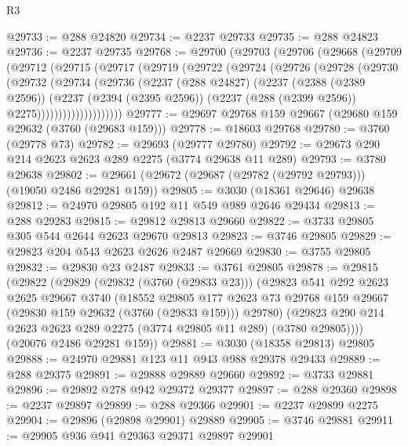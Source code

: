 \begin{lexlean}{R3}
\begin{coremodule}
@29733 := @288 @24820
@29734 := @2237 @29733
@29735 := @288 @24823
@29736 := @2237 @29735
@29768 := @29700
    (@29703
      (@29706
        (@29668
          (@29709
            (@29712
              (@29715
                (@29717
                  (@29719
                    (@29722
                      (@29724
                        (@29726
                          (@29728
                            (@29730
                              (@29732
                                (@29734
                                  (@29736
                                    (@2237
                                      (@288 @24827)
                                      (@2237
                                        (@2388 (@2389 @2596))
                                        (@2237
                                          (@2394 (@2395 @2596))
                                          (@2237 (@288 (@2399 @2596)) @2275))))))))))))))))))))
@29777 := @29697 @29768 @159 @29667 (@29680 @159 @29632 (@3760 (@29683 @159)))
@29778 := @18603 @29768
@29780 := @3760 (@29778 @73)
@29782 := @29693 (@29777 @29780)
@29792 := @29673 @290 @214 @2623 @2623 @289 @2275 (@3774 @29638 @11 @289)
@29793 := @3780 @29638
@29802 := @29661 (@29672 (@29687 (@29782 (@29792 @29793))) (@19050 @2486 @29281 @159))
@29805 := @3030 (@18361 @29646) @29638
@29812 := @24970 @29805 @192 @11 @549 @989 @2646 @29434
@29813 := @288 @29283
@29815 := @29812 @29813 @29660
@29822 := @3733 @29805 @305 @544 @2644 @2623 @29670 @29813
@29823 := @3746 @29805
@29829 := @29823 @204 @543 @2623 @2626 @2487 @29669
@29830 := @3755 @29805
@29832 := @29830 @23 @2487
@29833 := @3761 @29805
@29878 := @29815
    (@29822
      (@29829
        (@29832 (@3760 (@29833 @23)))
        (@29823
          @541
          @292
          @2623
          @2625
          @29667
          @3740
          (@18552
            @29805
            @177
            @2623
            @73
            @29768
            @159
            @29667
            (@29830 @159 @29632 (@3760 (@29833 @159)))
            @29780)
          (@29823 @290 @214 @2623 @2623 @289 @2275 (@3774 @29805 @11 @289) (@3780 @29805))))
      (@20076 @2486 @29281 @159))
@29881 := @3030 (@18358 @29813) @29805
@29888 := @24970 @29881 @123 @11 @943 @988 @29378 @29433
@29889 := @288 @29375
@29891 := @29888 @29889 @29660
@29892 := @3733 @29881
@29896 := @29892 @278 @942 @29372 @29377
@29897 := @288 @29360
@29898 := @2237 @29897
@29899 := @288 @29366
@29901 := @2237 @29899 @2275
@29904 := @29896 (@29898 @29901) @29889
@29905 := @3746 @29881
@29911 := @29905 @936 @941 @29363 @29371 @29897 @29901

\end{coremodule}
\end{lexlean}
